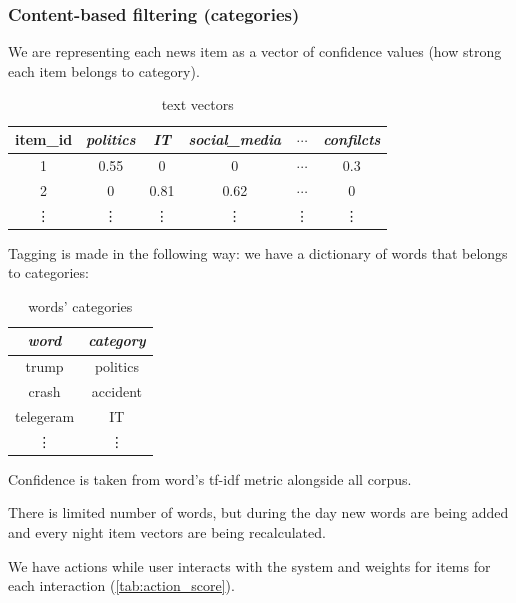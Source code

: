 \documentclass{article}
\begin{document}
\subsubsection{Content-based filtering (categories)}
\label{content}

We are representing each news item as a vector of confidence values (how strong each item belongs to category).

\begin{table}[h]
    \centering
    \begin{tabular}{cccccc}
        \toprule
        item\_id & \textit{politics} & \textit{IT} & \textit{social\_media} & $\cdots$ & \textit{confilcts} \\
        \midrule
        1 & 0.55 & 0 & 0 & $\cdots$ & 0.3 \\
        2 & 0    & 0.81  & 0.62 & $\cdots$ & 0 \\
        \vdots & \vdots & \vdots & \vdots & \vdots & \vdots\\

        \bottomrule
    \end{tabular}%
    \caption{text vectors}
    \label{tab:text_vectors}
\end{table}

Tagging is made in the following way: we have a dictionary of words that belongs to categories:

\begin{table}[h]
    \centering
    \begin{tabular}{cc}
        \toprule
        \textit{word} & \textit{category} \\
        \midrule
        trump & politics \\
        crash & accident \\
        telegeram & IT \\
        \vdots & \vdots \\
        \bottomrule
    \end{tabular}%
    \caption{words' categories}
    \label{tab:words_categories}
\end{table}

Confidence is taken from word's tf-idf metric alongside all corpus.

There is limited number of words, but during the day new words are being added and every night item vectors are being recalculated.

We have actions while user interacts with the system and weights for items for each interaction (\cref{tab:action_score}).
\end{document}
